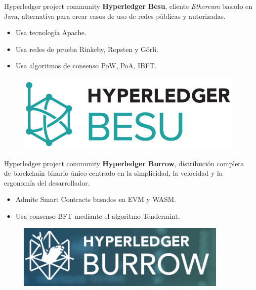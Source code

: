 \documentclass{beamer}
\begin{document}
	\begin{frame}
		\begin{block}{Hyperledger project community}
			\textbf{Hyperledger Besu}, cliente \textit{Ethereum} basado en Java, alternativa para crear casos de uso de redes públicas y autorizadas.
			\begin{itemize}
				\item Usa tecnología Apache.
				\item Usa redes de prueba Rinkeby, Ropsten y Görli.
				\item Usa algoritmos de consenso PoW, PoA, IBFT.
			\end{itemize}
			\begin{figure}[h]
				\includegraphics[scale=.3]{besu_logo}
				\centering
			\end{figure}
		\end{block}
	\end{frame}

	\begin{frame}
		\begin{block}{Hyperledger project community}
			\textbf{Hyperledger Burrow}, distribución completa de blockchain binario único centrado en la simplicidad, la velocidad y la ergonomía del desarrollador.
			\begin{itemize}
				\item Admite Smart Contracts basados en EVM y WASM.
				\item Usa consenso BFT mediante el algoritmo Tendermint.
			\end{itemize}
			\begin{figure}[h]
				\includegraphics[scale=.3]{burrow_logo}
				\centering
			\end{figure}
		\end{block}
	\end{frame}
\end{document}
